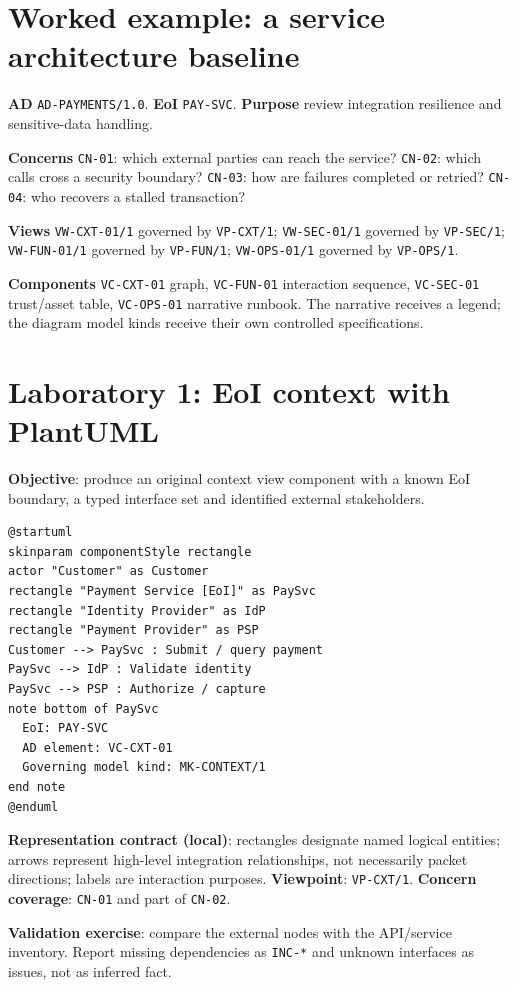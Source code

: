 \documentclass[11pt,letterpaper]{article}
\begin{document}
\section{Worked example: a service architecture baseline}
\begin{Worked}\textbf{AD} \texttt{AD-PAYMENTS/1.0}. \textbf{EoI} \texttt{PAY-SVC}. \textbf{Purpose} review integration resilience and sensitive-data handling.\par
\textbf{Concerns} \texttt{CN-01}: which external parties can reach the service? \texttt{CN-02}: which calls cross a security boundary? \texttt{CN-03}: how are failures completed or retried? \texttt{CN-04}: who recovers a stalled transaction?\par
\textbf{Views} \texttt{VW-CXT-01/1} governed by \texttt{VP-CXT/1}; \texttt{VW-SEC-01/1} governed by \texttt{VP-SEC/1}; \texttt{VW-FUN-01/1} governed by \texttt{VP-FUN/1}; \texttt{VW-OPS-01/1} governed by \texttt{VP-OPS/1}.\par
\textbf{Components} \texttt{VC-CXT-01} graph, \texttt{VC-FUN-01} interaction sequence, \texttt{VC-SEC-01} trust/asset table, \texttt{VC-OPS-01} narrative runbook. The narrative receives a legend; the diagram model kinds receive their own controlled specifications.\end{Worked}
\section{Laboratory 1: EoI context with PlantUML}
\textbf{Objective}: produce an original context view component with a known EoI boundary, a typed interface set and identified external stakeholders.\par
\begin{lstlisting}[caption={Example only: examples/01-context.puml}]
@startuml
skinparam componentStyle rectangle
actor "Customer" as Customer
rectangle "Payment Service [EoI]" as PaySvc
rectangle "Identity Provider" as IdP
rectangle "Payment Provider" as PSP
Customer --> PaySvc : Submit / query payment
PaySvc --> IdP : Validate identity
PaySvc --> PSP : Authorize / capture
note bottom of PaySvc
  EoI: PAY-SVC
  AD element: VC-CXT-01
  Governing model kind: MK-CONTEXT/1
end note
@enduml
\end{lstlisting}
\textbf{Representation contract (local)}: rectangles designate named logical entities; arrows represent high-level integration relationships, not necessarily packet directions; labels are interaction purposes. \textbf{Viewpoint}: \texttt{VP-CXT/1}. \textbf{Concern coverage}: \texttt{CN-01} and part of \texttt{CN-02}.\par
\textbf{Validation exercise}: compare the external nodes with the API/service inventory. Report missing dependencies as \texttt{INC-*} and unknown interfaces as issues, not as inferred fact.\par
\end{document}
